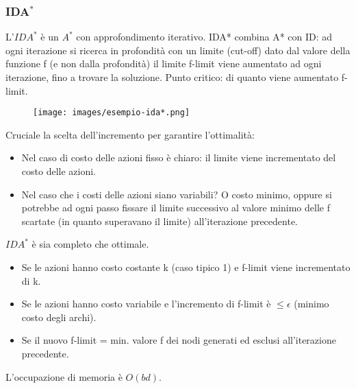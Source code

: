 \subsubsection{IDA${}^*$}
L'$IDA^*$ è un $A^*$ con approfondimento iterativo. IDA* combina A* con ID: ad ogni iterazione si ricerca
in profondità con un limite (cut-off) dato dal valore della funzione f (e non dalla profondità) il limite f-limit viene aumentato ad ogni iterazione,
fino a trovare la soluzione. Punto critico: di quanto viene aumentato f-limit.
\begin{example}
    \begin{figure}[h!]
        \centering
        \texttt{[image: images/esempio-ida*.png]}
    \end{figure}
\end{example}
\hspace{-15pt}Cruciale la scelta dell'incremento per garantire l’ottimalità:
\begin{itemize}
    \item Nel caso di costo delle azioni fisso è chiaro: il limite viene incrementato del costo delle azioni.
    \item Nel caso che i costi delle azioni siano variabili? O costo minimo, oppure si potrebbe ad ogni passo fissare il limite successivo al
    valore minimo delle f scartate (in quanto superavano il limite) all’iterazione precedente.
\end{itemize}
$IDA^*$ è sia completo che ottimale.
\begin{itemize}
    \item Se le azioni hanno costo costante k (caso tipico 1) e f-limit viene incrementato di k.
    \item Se le azioni hanno costo variabile e l'incremento di f-limit è $\leq \epsilon$ (minimo costo degli archi).
    \item Se il nuovo f-limit = min. valore f dei nodi generati ed esclusi all'iterazione precedente.
\end{itemize}
L'occupazione di memoria è $O(bd)$.

